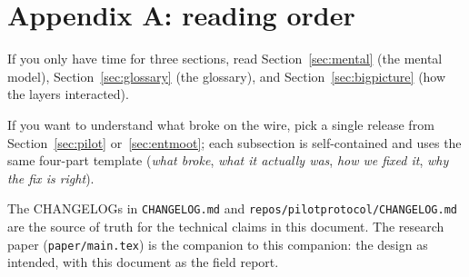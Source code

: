 \documentclass[11pt,a4paper]{article}
\begin{document}
\section*{Appendix A: reading order}

If you only have time for three sections, read
Section~\ref{sec:mental} (the mental model),
Section~\ref{sec:glossary} (the glossary), and
Section~\ref{sec:bigpicture} (how the layers interacted).

If you want to understand what broke on the wire, pick a single
release from Section~\ref{sec:pilot} or~\ref{sec:entmoot}; each
subsection is self-contained and uses the same four-part
template (\emph{what broke}, \emph{what it actually was},
\emph{how we fixed it}, \emph{why the fix is right}).

The CHANGELOGs in \texttt{CHANGELOG.md} and
\texttt{repos/pilotprotocol/CHANGELOG.md} are the source of
truth for the technical claims in this document. The research
paper (\texttt{paper/main.tex}) is the companion to this
companion: the design as intended, with this document as the
field report.
\end{document}
